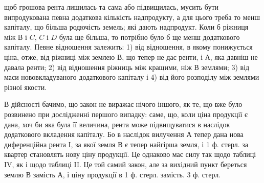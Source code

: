 \parcont{}  %
щоб грошова рента лишилась та сама або підвищилась, мусить бути випродукована
певна додаткова кількість надпродукту, а для цього треба то менш
капіталу, що більша родючість земель; які дають надпродукт. Коли б ріжниця
між $В$ і $C$, $C$ і $D$ була ще більша, то потрібно було б ще менш додаткового
капіталу. Певне відношення залежить: 1) від відношення, в якому понижується
ціна, отже, від ріжниці між землею $В$, що тепер не дає ренти, і $А$, яка давніш
не давала ренти; 2) від відношення ріжниць між кращими, ніж $В$ землями; 3) від
маси нововкладуваного додаткового капіталу і 4) від його розподілу між землями
різної якости.

В дійсності бачимо, що закон не виражає нічого іншого, як те, що вже
було розвинено при дослідженні першого випадку: саме, що, коли ціна продукції
є дана, хоч би яка була її величина, рента може підвищуватися в наслідок
додаткового вкладення капіталу. Бо в наслідок вилучення $А$ тепер дана нова диференційна
рента І, за якої земля $В$ є тепер найгірша земля, і 1 ф. стерл. за
квартер становлять нову ціну продукції. Це однаково має силу так щодо таблиці
IV, як і щодо таблиці II. Це той самий закон, але за вихідний
пункт береться землю $В$ замість $А$, і ціну продукції в 1 ф. стерл. замість.
3 ф. стерл.

